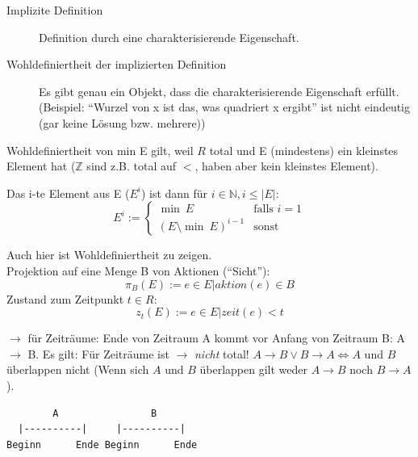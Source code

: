 \begin{description}
	\item[Implizite Definition] Definition durch eine charakterisierende Eigenschaft.
	\item[Wohldefiniertheit der implizierten Definition] Es gibt genau ein Objekt, dass die charakterisierende Eigenschaft erfüllt.
	(Beispiel: "`Wurzel von x ist das, was quadriert x ergibt"' ist nicht eindeutig (gar keine Lösung bzw. mehrere))
\end{description}

Wohldefiniertheit von min E gilt, weil $ R $ total und E (mindestens) ein kleinstes Element hat ($ \mathbb{Z} $ sind z.B. total auf $ < $, haben aber kein kleinstes Element).

Das i-te Element aus E ($ E^i $) ist dann für $ i \in \mathbb{N}, i \leq |E| $:
\begin{equation*}
	E^i := \begin{cases}
		\min \ E & \text{falls } i = 1\\
		(E \setminus{\min \ E})^{i - 1} & \text{sonst}
	\end{cases}
\end{equation*}

Auch hier ist Wohldefiniertheit zu zeigen.\\
Projektion auf eine Menge B von Aktionen ("`Sicht"'):
\begin{equation*}
	\pi_B(E) := e \in E | aktion(e) \in B
\end{equation*}
Zustand zum Zeitpunkt $ t \in R $:
\begin{equation*}
	z_t(E) := e \in E | zeit(e) < t
\end{equation*}

$ \rightarrow $ für Zeiträume: Ende von Zeitraum A kommt vor Anfang von Zeitraum B: A $ \rightarrow $ B. Es gilt: Für Zeiträume ist $ \rightarrow $ \emph{nicht} total!
$ A \rightarrow B \vee B \rightarrow A \Leftrightarrow A $ und $ B $ überlappen nicht (Wenn sich $ A $ und $ B $ überlappen gilt weder $ A  \rightarrow B $ noch $ B \rightarrow A $).

\begin{lstlisting}
        A                B
  |----------|     |----------|
Beginn      Ende Beginn      Ende
\end{lstlisting}

